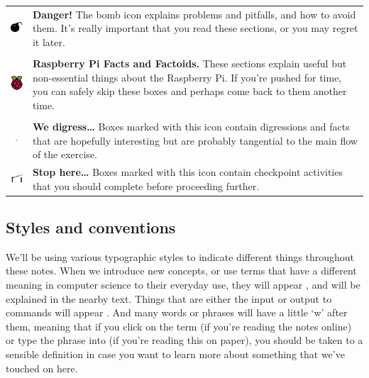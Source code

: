 \begin{tabular}{m{1.5cm}m{12cm}}
{\includegraphics[width=1.5cm]{images/bomb}} & \textbf{Danger!} The bomb icon explains problems and pitfalls, and how to avoid them. It's really important that you read these sections, or you may regret it later.\\
\\
\includegraphics[width=1.5cm]{images/rpi-logo} & \textbf{Raspberry Pi Facts and Factoids.} These sections explain useful but non-essential things about the Raspberry Pi. If you're pushed for time, you can safely skip these boxes and perhaps come back to them another time.\\
\\
\includegraphics[width=1.5cm]{images/diversion} & \textbf{We digress\ldots} Boxes marked with this icon contain digressions and facts that are hopefully interesting but are probably tangential to the main flow of the exercise.\\
\includegraphics[width=1.5cm]{images/roadblock} & \textbf{Stop here\ldots} Boxes marked with this icon contain checkpoint activities that you should complete before proceeding further.\\
\end{tabular}

\subsection{Styles and conventions}

We'll be using various typographic styles to indicate different things throughout these notes. When we introduce new concepts, or use terms that have a different meaning in computer science to their everyday use, they will appear , and will be explained in the nearby text. Things that are either the input or output to commands will appear . And many words or phrases will have a little `w' after them, meaning that if you click on the term (if you're reading the notes online) or type the phrase into  (if you're reading this on paper), you should be taken to a sensible definition in case you want to learn more about something that we've touched on here. 

